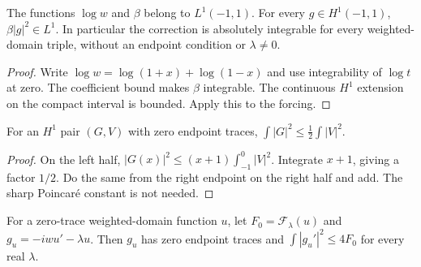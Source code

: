 \begin{lemma}
\label{lem:corrected-correction-integrable}
\leanok
The functions $\log w$ and $\beta$ belong to $L^1(-1,1)$.
For every $g\in H^1(-1,1)$, $\beta|g|^2\in L^1$.
In particular the correction is absolutely integrable for every
weighted-domain triple, without an endpoint condition or $\lambda\ne0$.
\end{lemma}

\begin{proof}
\leanok
Write $\log w=\log(1+x)+\log(1-x)$ and use integrability of $\log t$
at zero. The coefficient bound makes $\beta$ integrable.
The continuous $H^1$ extension on the compact interval is bounded.
Apply this to the forcing.
\end{proof}

\begin{lemma}
\label{lem:corrected-half-poincare}
\leanok
For an $H^1$ pair $(G,V)$ with zero endpoint traces,
$\int|G|^2\le\tfrac12\int|V|^2$.
\end{lemma}

\begin{proof}
\leanok
On the left half, $|G(x)|^2\le(x+1)\int_{-1}^0|V|^2$.
Integrate $x+1$, giving a factor $1/2$. Do the same from the right
endpoint on the right half and add. The sharp Poincar\'e constant is
not needed.
\end{proof}

\begin{lemma}
\label{lem:corrected-zero-energy}
\leanok
For a zero-trace weighted-domain function $u$, let
$F_0=\mathcal F_\lambda(u)$ and $g_u=-iwu'-\lambda u$.
Then $g_u$ has zero endpoint traces and
$\int|g_u'|^2\le4F_0$ for every real $\lambda$.
\end{lemma}


